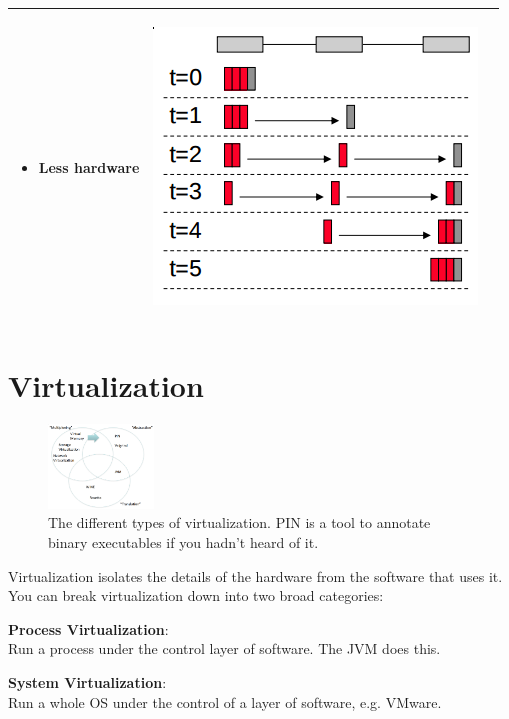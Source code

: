 \begin{center}
\begin{tabular}{| m{2cm} | m{5cm} | c |}
\begin{itemize}
      \item Less hardware
    \end{itemize} & 
    \begin{minipage}{.3\textwidth}
      \begin{center}
        \includegraphics[width=0.5\linewidth]{images/wormhole}
      \end{center}
    \end{minipage} \\ \hline
  \end{tabular}
\end{center}

\section{Virtualization}

\begin{figure}
  \centering
  \includegraphics[width=0.25\textwidth]{images/types-of-virtualization}
  \caption{The different types of virtualization. PIN is a tool to annotate
  binary executables if you hadn't heard of it.}
  \label{types-of-virtualization}
\end{figure}

Virtualization isolates the details of the hardware from the software that uses
it. You can break virtualization down into two broad categories:

\begin{description}
  \item \textbf{Process Virtualization}:\\
    Run a process under the control layer of software. The JVM does this.
  \item \textbf{System Virtualization}:\\
    Run a whole OS under the control of a layer of software, e.g. VMware.
\end{description}


